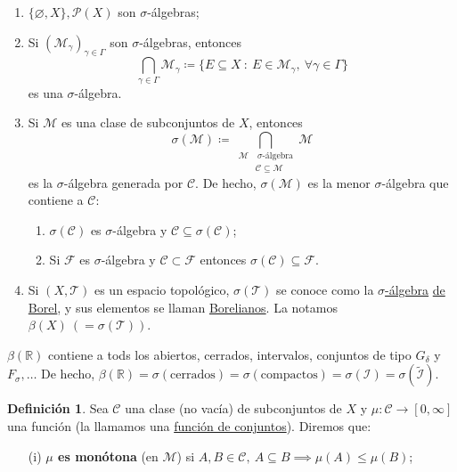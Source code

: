 \documentclass[11pt]{article}
\theoremstyle{definition} %
\newtheorem{definition}[theorem]{Definición}
\newcommand{\R}{\mathbb{R}}
\begin{document}
\begin{property}
\begin{eg}
\begin{enumerate}
			\item $\{\varnothing,X\},\mathcal{P}(X)$ son $\sigma$-álgebras;

			\item Si $(\mathscr{M}_{\gamma})_{\gamma \in \Gamma}$ son $\sigma$-álgebras, entonces
			\[ \displaystyle\bigcap_{\gamma\in\Gamma} \mathscr{M}_{\gamma} \coloneq \{ E \subseteq X \ : \ E \in \mathscr{M}_{\gamma},\ \forall \gamma \in \Gamma \} \]
			es una $\sigma$-álgebra.
			
			\item Si $\mathscr{M}$ es una clase de subconjuntos de $X$, entonces
			\[ \sigma(\mathscr{M}) \coloneq \displaystyle\bigcap_{\begin{aligned}
				\mathscr{M}& \ \sigma\text{-álgebra} \\
				& \mathscr{C}\subseteq\mathscr{M}
			\end{aligned}} \mathscr{M} \]
			es la $\sigma$-álgebra generada por $\mathscr{C}$. De hecho, $\sigma(\mathscr{M})$ es la menor $\sigma$-álgebra que contiene a $\mathscr{C}$:
			\begin{enumerate}
				\item $\sigma(\mathscr{C})$ es $\sigma$-álgebra y $\mathscr{C} \subseteq \sigma(\mathscr{C})$;

				\item Si $\mathscr{F}$ es $\sigma$-álgebra y $\mathscr{C} \subset \mathscr{F}$ entonces $\sigma(\mathscr{C}) \subseteq \mathscr{F}$.
			\end{enumerate}

			\item Si $(X,\mathscr{T})$ es un espacio topológico, $\sigma(\mathscr{T})$ se conoce como la \underline{$\sigma$-álgebra} \underline{de Borel}, y sus elementos se llaman \underline{Borelianos}. La notamos $\beta(X)\ (= \sigma(\mathscr{T}))$.
		\end{enumerate}
	\end{eg}
	
	\begin{eg}
		$\beta(\R)$ contiene a tods los abiertos, cerrados, intervalos, conjuntos de tipo $G_{\delta}$ y $F_{\sigma},\dots$ De hecho, $\beta(\R)=\sigma(\text{cerrados})=\sigma(\text{compactos})=\sigma(\mathcal{I})=\sigma(\widetilde{\mathcal{I}})$.
	\end{eg}

	\begin{definition}
		Sea $\mathscr{C}$ una clase (no vacía) de subconjuntos de $X$ y $\mu : \mathscr{C} \to [0,\infty]$ una función (la llamamos una \underline{función de conjuntos}). Diremos que:
		\begin{enumerate}
			\item[(i)] \textbf{$\mu$ es monótona} (en $\mathscr{M}$) si $A,B\in\mathscr{C},\ A \subseteq B \implies \mu(A)\leq\mu(B)$;


\end{enumerate}
\end{definition}
\end{property}
\end{document}
